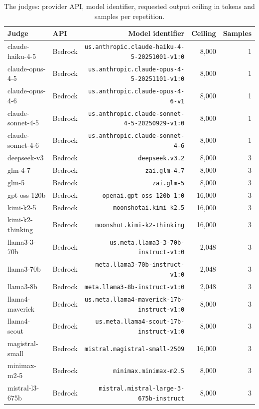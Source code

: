 \documentclass{IOS-Book-Article}
\begin{document}
\begin{table}[!ht]
\centering
\caption{The judges: provider API, model identifier, requested output ceiling in tokens and samples per repetition.}
\footnotesize\setlength{\tabcolsep}{2pt}
\begin{tabular}{llrrr}
\hline
\textbf{Judge} & \textbf{API} & \textbf{Model identifier} & \textbf{Ceiling} & \textbf{Samples} \\
\hline
claude-haiku-4-5 & Bedrock & \texttt{us.anthropic.claude-haiku-4-5-20251001-v1:0} & 8,000 & 1 \\
claude-opus-4-5 & Bedrock & \texttt{us.anthropic.claude-opus-4-5-20251101-v1:0} & 8,000 & 1 \\
claude-opus-4-6 & Bedrock & \texttt{us.anthropic.claude-opus-4-6-v1} & 8,000 & 1 \\
claude-sonnet-4-5 & Bedrock & \texttt{us.anthropic.claude-sonnet-4-5-20250929-v1:0} & 8,000 & 1 \\
claude-sonnet-4-6 & Bedrock & \texttt{us.anthropic.claude-sonnet-4-6} & 8,000 & 1 \\
deepseek-v3 & Bedrock & \texttt{deepseek.v3.2} & 8,000 & 3 \\
glm-4-7 & Bedrock & \texttt{zai.glm-4.7} & 8,000 & 3 \\
glm-5 & Bedrock & \texttt{zai.glm-5} & 8,000 & 3 \\
gpt-oss-120b & Bedrock & \texttt{openai.gpt-oss-120b-1:0} & 16,000 & 3 \\
kimi-k2-5 & Bedrock & \texttt{moonshotai.kimi-k2.5} & 16,000 & 3 \\
kimi-k2-thinking & Bedrock & \texttt{moonshot.kimi-k2-thinking} & 16,000 & 3 \\
llama3-3-70b & Bedrock & \texttt{us.meta.llama3-3-70b-instruct-v1:0} & 2,048 & 3 \\
llama3-70b & Bedrock & \texttt{meta.llama3-70b-instruct-v1:0} & 2,048 & 3 \\
llama3-8b & Bedrock & \texttt{meta.llama3-8b-instruct-v1:0} & 2,048 & 3 \\
llama4-maverick & Bedrock & \texttt{us.meta.llama4-maverick-17b-instruct-v1:0} & 8,000 & 3 \\
llama4-scout & Bedrock & \texttt{us.meta.llama4-scout-17b-instruct-v1:0} & 8,000 & 3 \\
magistral-small & Bedrock & \texttt{mistral.magistral-small-2509} & 16,000 & 3 \\
minimax-m2-5 & Bedrock & \texttt{minimax.minimax-m2.5} & 8,000 & 3 \\
mistral-l3-675b & Bedrock & \texttt{mistral.mistral-large-3-675b-instruct} & 8,000 & 3 \\

\end{tabular}
\end{table}
\end{document}
